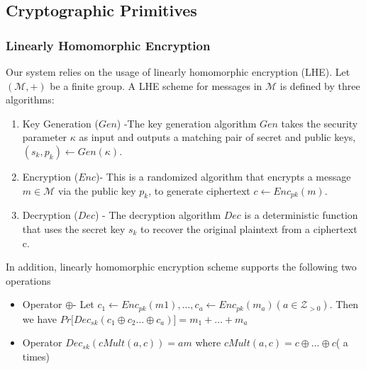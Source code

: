 \begin{comment}
\subsubsection{Computational Differential Privacy}
\begin{definition}
 (IND-CDP privacy) An ensemble $\{f_\kappa\}\kappa  \in N$ of randomized
functions $f_\kappa : D \rightarrow R_\kappa$ provides $(\epsilon,
\kappa)$-ind-cdp if there exists a negligible function $negl(\cdot)$ such that for every nonuniform p.p.t turing machine (“distinguisher”) $A$, every polynomial $p(\cdot)$, every sufficiently large $\kappa \in N$ all
data sets $D,D' \in \mathcal{D}$ of size at most $p(\kappa)$ such that $|D-D'|\leq  1$, and
every advice string $z_{\kappa}$ of size at most $p(\kappa)$, it holds that \begin{gather}
Pr [A_{\kappa}(f_{\kappa}(D)) = 1] \leq e^{\epsilon} \times Pr[A_{\kappa}(f_{\kappa}(D')) = 1]
+ negl(\kappa)\end{gather}
where we write $A_\kappa(x)$ for $A(1^{\kappa}, z_{\kappa}, x)$ and the probability is taken over
the randomness of mechanism $f_\kappa$ and adversary $A_\kappa$.
\end{definition}


\end{comment}
\subsection{Cryptographic Primitives}
\subsubsection{Linearly Homomorphic Encryption}
Our system relies on the usage of linearly homomorphic
encryption (LHE). Let $(\mathcal{M}, +)$ be a finite group. A LHE scheme 
for messages in $\mathcal{M}$ is defined by three algorithms:\begin{enumerate}
\item Key Generation ($Gen$) -The key generation algorithm $Gen$ takes the security parameter $\kappa$ as input and outputs
a matching pair of secret and public keys, $(s_k, p_k) \leftarrow Gen(\kappa)$.
\item Encryption ($Enc$)- This is a randomized algorithm that encrypts a message $m \in \mathcal{M}$ via the public key $p_k$, to generate ciphertext $c \leftarrow Enc_{pk}(m)$.
\item Decryption ($Dec$) - The decryption algorithm $Dec$ is a deterministic function that uses the secret key $s_k$ to
recover the original plaintext from a ciphertext c.
\end{enumerate}
In addition, linearly homomorphic encryption scheme supports the following two operations
\begin{itemize}\item Operator $\oplus$- Let $c_1 \leftarrow Enc_{pk}(m1), \ldots, c_a \leftarrow Enc_{pk}(m_a) (a \in \mathcal{Z}_{>0})$. Then we have  $Pr\big[Dec_{sk}(c_1\oplus c_2 ...\oplus c_a)\big]=    m_1 + \ldots   + m_a$  
\item Operator $Dec_{sk}(cMult(a,c))=am$ where $cMult(a,c)=c\oplus \ldots \oplus c$( a times) \end{itemize}
